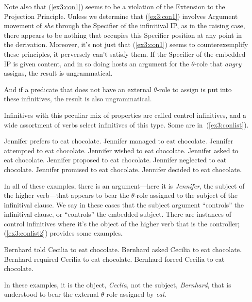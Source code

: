 Note also that (\ref{ex3:con1}) seems to be a violation of the Extension to the Projection Principle. Unless we determine that (\ref{ex3:con1}) involves Argument movement of \emph{she} through the Specifier of the infinitival IP, as in the raising case, there appears to be nothing that occupies this Specifier position at any point in the derivation. Moreover, it's not just that (\ref{ex3:con1}) seems to counterexemplify these principles, it perversely can't satisfy them. If the Specifier of the embedded IP is given content, and in so doing hosts an argument for the  $\theta$-role that \emph{angry} assigns, the result is ungrammatical.
\begin{exe}
\end{exe}
And if a predicate that does not have an external \mbox{$\theta$-role} to assign is put into these infinitives, the result is also ungrammatical.
\begin{exe}
\end{exe}

Infinitives with this peculiar mix of properties are called control infinitives, and a wide assortment of verbs select infinitives of this type. Some are in~(\ref{ex3:conlist}).
\begin{exe}
	\ex \label{ex3:conlist}
	\begin{xlist}
	\ex Jennifer prefers to eat chocolate.
	\ex Jennifer managed to eat chocolate.
	\ex Jennifer attempted to eat chocolate.
	\ex Jennifer wished to eat chocolate.
	\ex Jennifer asked to eat chocolate.
	\ex Jennifer proposed to eat chocolate.
	\ex Jennifer neglected to eat chocolate.
	\ex Jennifer promised to eat chocolate.
	\ex Jennifer decided to eat chocolate.
\end{xlist}
\end{exe}
In all of these examples, there is an argument---here it is \emph{Jennifer}, the subject of the higher verb---that appears to bear the \mbox{$\theta$-role} assigned to the subject of the infinitival clause. We say in these cases that the subject argument ``controls'' the infinitival clause, or ``controls'' the embedded subject. There are instances of control infinitives where it's the object of the higher verb that is the controller; (\ref{ex3:conlist2}) provides some examples.
\begin{exe}
\ex \label{ex3:conlist2} 
\begin{xlist}
	\ex Bernhard told Cecilia to eat chocolate.
	\ex Bernhard asked Cecilia to eat chocolate.
	\ex Bernhard required Cecilia to eat chocolate.
	\ex Bernhard forced Cecilia to eat chocolate.
\end{xlist}
\end{exe}
In these examples, it is the object, \emph{Ceclia}, not the subject, \emph{Bernhard}, that is understood to bear the external \mbox{$\theta$-role} assigned by \emph{eat}.

